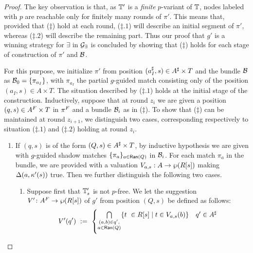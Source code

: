 \begin{proof}
The key observation is that, as $\mathbb{T}'$ is a \emph{finite} $p$-variant of $\mathbb{T}$, nodes labeled with $p$ are reachable only for finitely many rounds of $\pi'$. This means that, provided that ($\ddag$) hold at each round, ($\ddag.1$) will describe an initial segment of $\pi'$, whereas ($\ddag.2$) will describe the remaining part. Thus our proof that $g'$ is a winning strategy for $\exists$ in $\mathcal{G}_{\exists}$ is concluded by showing that ($\ddag$) holds for each stage of construction of $\pi'$ and $\mathcal{B}$.

For this purpose, we initialize $\pi'$ from position $(a_{I}^{\sharp},s) \in A^{\sharp}\times T$ and the bundle $\mathcal{B}$ as $\mathcal{B}_0 = \{\pi_{a_I}\}$, with $\pi_{a_I}$ the partial $g$-guided match consisting only of the position $(a_I,s)\in A\times T$. The situation described by ($\ddag .1$) holds at the initial stage of the construction.
Inductively, suppose that at round $z_i$ we are given a position $(q,s) \in A^{F} \times T$ in $\pi^{F}$ and a bundle $\mathcal{B}_i$ as in ($\ddag$). To show that ($\ddag$) can be maintained at round $z_{i+1}$, we distinguish two cases, corresponding respectively to situation ($\ddag.1$) and ($\ddag.2$) holding at round $z_i$.
\begin{enumerate}[label = (\Alph*), ref = \Alph*]
  \item If $(q,s)$ is of the form $(Q,s) \in A^{\sharp} \times T$, by inductive hypothesis we are given with $g$-guided shadow matches $\{\pi_a\}_{a \in \mathsf{Ran}(Q)}$ in $\mathcal{B}_i$. For each match $\pi_a$ in the bundle, we are provided with a valuation $V_{a,s}: A \rightarrow \wp (R[s])$ making $\Delta(a,\kappa'(s))$ true. Then we further distinguish the following two cases.
\begin{enumerate}[label = (\roman*), ref = \roman*]
  \item \label{point:TsNotPFree} Suppose first that $\mathbb{T}'_s$ is not $p$-free. We let the suggestion $V' \colon A^{F} \to \wp (R[s])$ of $g'$ from position $(Q,s)$ be defined as follows:
       \begin{align*}
       V'(q')\ :=\ \begin{cases}
               \bigcap\limits_{\substack{(a,b) \in q',\\ a \in \mathsf{Ran}(Q)}}\{t\ \in R[s] \mid t \in V_{a,s}(b)\}               & q' \in A^{\sharp} \\[2em]

\end{cases}
\end{align*}
\end{enumerate}
\end{enumerate}
\end{proof}
